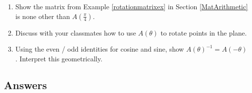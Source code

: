 \begin{enumerate}
\setcounter{enumi}{\value{HW}}
\item  Show the matrix from Example \ref{rotationmatrixex} in Section \ref{MatArithmetic} is none other than $A\left(\frac{\pi}{4}\right)$.

\item  Discuss with your classmates how to use $A(\theta)$ to rotate points in the plane.

\item  Using the even / odd identities for cosine and sine,  show $A(\theta)^{-1} = A(-\theta)$.  Interpret this geometrically.



\end{enumerate}

\newpage

\subsection{Answers}

